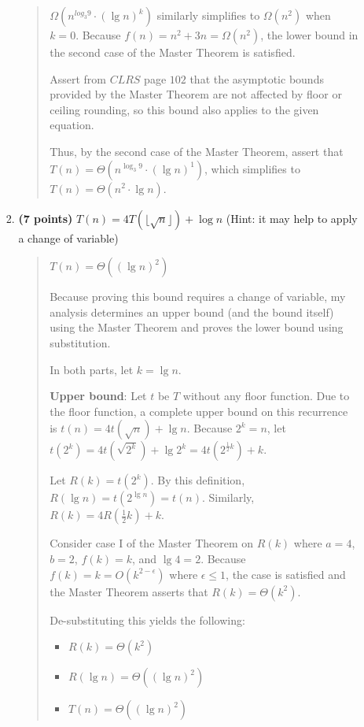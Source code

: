 \documentclass[11pt]{article}
\begin{document}
\begin{enumerate}[leftmargin=*]
\begin{enumerate}
\begin{enumerate}
\begin{quote}
          \medskip
          $\Omega(n^{log_{3}9} \cdot (\lg n)^k)$ similarly simplifies to $\Omega(n^2)$ when $k = 0$. Because $f(n) = n^2 + 3n = \Omega(n^2)$, the lower bound in the second case of the Master Theorem is satisfied.

          Assert from $CLRS$ page $102$ that the asymptotic bounds provided by the Master Theorem are not affected by floor or ceiling rounding, so this bound also applies to the given equation.

          \medskip
          Thus, by the second case of the Master Theorem, assert that $T(n) = \Theta(n^{\log_{3}9} \cdot (\lg n)^{1})$, which simplifies to $T(n) = \Theta(n^2 \cdot \lg n)$.
        \end{quote}
        \item 
        {\bf (7 points)}
        $T(n) = 4T(\lfloor \sqrt{n} \rfloor) + \log n$ (Hint: it may help to apply a change of variable)
        \begin{quote}
          \color{purple}
          $T(n) = \Theta((\lg n)^2)$

          \medskip
          Because proving this bound requires a change of variable, my analysis determines an upper bound (and the bound itself) using the Master Theorem and proves the lower bound using substitution. 

          \medskip
          In both parts, let $k = \lg n$.
          
          \medskip 
          \textbf{Upper bound}:
          Let $t$ be $T$ without any floor function. Due to the floor function, a complete upper bound on this recurrence is $t(n) = 4t(\sqrt n) + \lg n$. Because $2^k = n$, let $t(2^k) = 4t(\sqrt{2^k}) + \lg{2^k} = 4t(2^{\frac{1}{2}k}) + k$.

          \medskip
           Let $R(k) = t(2^k)$. By this definition, $R(\lg n) = t(2^{\lg n}) = t(n)$. Similarly, $R(k) = 4R(\frac{1}{2}k) + k$.

          \medskip
          Consider case I of the Master Theorem on $R(k)$ where $a = 4$, $b = 2$, $f(k) = k$, and $\lg 4 = 2$. Because $f(k) = k = O(k^{2 - \epsilon})$ where $\epsilon \leq 1$, the case is satisfied and the Master Theorem asserts that $R(k) = \Theta(k^2)$.

          \medskip
          De-substituting this yields the following:
          \begin{itemize}
            \item $R(k) = \Theta(k^2)$ 
            \item $R(\lg n) = \Theta((\lg n)^2)$
            \item $T(n) = \Theta((\lg n)^2)$
          \end{itemize}


\end{quote}
\end{enumerate}
\end{enumerate}
\end{enumerate}
\end{document}
